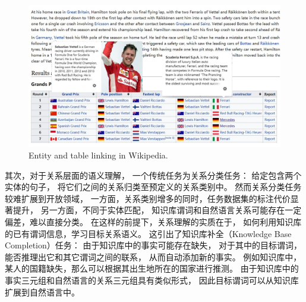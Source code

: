 \begin{figure}[th]
\centering
\includegraphics[width=0.95\columnwidth]{figure/intro/1_wikification.jpg}
{Entity and table linking in Wikipedia.}
\label{fig:intro-wikification}
\end{figure}




其次，对于关系层面的语义理解，   
一个传统任务为关系分类任务：
给定包含两个实体的句子，
将它们之间的关系归类至预定义的关系类别中。
然而关系分类任务较难扩展到开放领域，
一方面，关系类别增多的同时，任务数据集的标注代价显著提升，
另一方面，不同于实体匹配，
知识库谓词和自然语言关系可能存在一定偏差，难以直接分类。
在这样的前提下，关系理解的实质在于，
如何利用知识库的已有谓词信息，学习目标关系语义。
这引出了知识库补全（Knowledge Base Completion）任务：
由于知识库中的事实可能存在缺失，
对于其中的目标谓词，能否推理出它和其它谓词之间的联系，
从而自动添加新的事实。
例如知识库中，某人的国籍缺失，那么可以根据其出生地所在的国家进行推测。
由于知识库中的事实三元组和自然语言的关系三元组具有类似形式，
因此目标谓词可以从知识库扩展到自然语言中。


